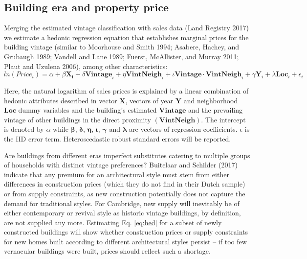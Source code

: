 \documentclass[]{article}
\begin{document}
\hypertarget{building-era-and-property-price}{%
\subsection{Building era and property
price}\label{building-era-and-property-price}}

Merging the estimated vintage classification with sales data (Land
Registry 2017) we estimate a hedonic regression equation that
establishes marginal prices for the building vintage (similar to
Moorhouse and Smith 1994; Asabere, Hachey, and Grubaugh 1989; Vandell
and Lane 1989; Fuerst, McAllister, and Murray 2011; Plaut and Uzulena
2006), among other characteristics: \begin{equation} \label{eq:hed}
  ln(Price_i) = \alpha + \beta\mathbf{X_i} + \delta\mathbf{Vintage}_i + \eta\mathbf{VintNeigh}_i + \iota\mathbf{Vintage\cdot VintNeigh}_i  +\gamma\mathbf{Y}_i + \lambda\mathbf{Loc}_i +  \epsilon_i
\end{equation}

Here, the natural logarithm of sales prices is explained by a linear
combination of hedonic attributes described in vector \(\mathbf{X}\),
vectors of year \(\mathbf{Y}\) and neighborhood \(\bm{Loc}\) dummy
variables and the building's estimated \(\mathbf{Vintage}\) and the
prevailing vintage of other buildings in the direct proximity
\((\mathbf{VintNeigh})\). The intercept is denoted by \(\alpha\) while
\(\bm{\beta}\), \(\bm{\delta}\), \(\bm{\eta}\), \(\bm{\iota}\),
\(\bm{\gamma}\) and \(\bm{\lambda}\) are vectors of regression
coefficients. \(\epsilon\) is the IID error term. Heteroscedastic robust
standard errors will be reported.

Are buildings from different eras imperfect substitutes catering to
multiple groups of households with distinct vintage preferences?
Buitelaar and Schilder (2017) indicate that any premium for an
architectural style must stem from either differences in construction
prices (which they do not find in their Dutch sample) or from supply
constraints, as new construction potentially does not capture the demand
for traditional styles. For Cambridge, new supply will inevitably be of
either contemporary or revival style as historic vintage buildings, by
definition, are not supplied any more. Estimating Eq. \ref{eq:hed} for a
subset of newly constructed buildings will show whether construction
prices or supply constraints for new homes built according to different
architectural styles persist -- if too few vernacular buildings were
built, prices should reflect such a shortage.
\end{document}
